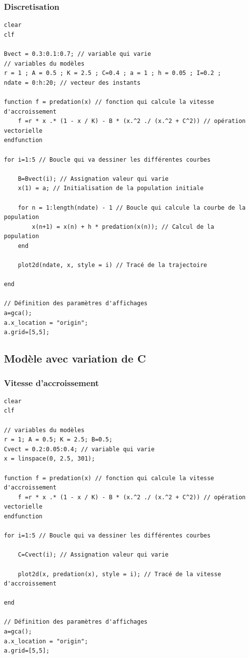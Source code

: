 \documentclass{article}
\begin{document}
\subsubsection{Discretisation}

\begin{verbatim}
clear
clf

Bvect = 0.3:0.1:0.7; // variable qui varie
// variables du modèles
r = 1 ; A = 0.5 ; K = 2.5 ; C=0.4 ; a = 1 ; h = 0.05 ; I=0.2 ;
ndate = 0:h:20; // vecteur des instants

function f = predation(x) // fonction qui calcule la vitesse d'accroissement
    f =r * x .* (1 - x / K) - B * (x.^2 ./ (x.^2 + C^2)) // opération vectorielle
endfunction

for i=1:5 // Boucle qui va dessiner les différentes courbes
    
    B=Bvect(i); // Assignation valeur qui varie
    x(1) = a; // Initialisation de la population initiale
    
    for n = 1:length(ndate) - 1 // Boucle qui calcule la courbe de la population
        x(n+1) = x(n) + h * predation(x(n)); // Calcul de la population
    end
    
    plot2d(ndate, x, style = i) // Tracé de la trajectoire

end

// Définition des paramètres d'affichages
a=gca();
a.x_location = "origin";
a.grid=[5,5];
\end{verbatim}


\subsection{Modèle avec variation de C}

\subsubsection{Vitesse d'accroissement}

\begin{verbatim}
clear
clf

// variables du modèles
r = 1; A = 0.5; K = 2.5; B=0.5;
Cvect = 0.2:0.05:0.4; // variable qui varie
x = linspace(0, 2.5, 301);

function f = predation(x) // fonction qui calcule la vitesse d'accroissement
    f =r * x .* (1 - x / K) - B * (x.^2 ./ (x.^2 + C^2)) // opération vectorielle
endfunction

for i=1:5 // Boucle qui va dessiner les différentes courbes
 
    C=Cvect(i); // Assignation valeur qui varie

    plot2d(x, predation(x), style = i); // Tracé de la vitesse d'accroissement

end

// Définition des paramètres d'affichages
a=gca();
a.x_location = "origin";
a.grid=[5,5];
\end{verbatim}
\end{document}
